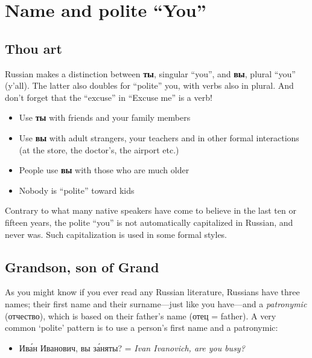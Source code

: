 \chapter{\texorpdfstring{Name and polite
``You''}{Name and polite You}}\label{name-and-polite-you}

\section{Thou art}\label{thou-art}

Russian makes a distinction between \textbf{ты}, singular ``you'', and
\textbf{вы}, plural ``you'' (y'all). The latter also doubles for
``polite'' you, with verbs also in plural. And don't forget that the
``excuse'' in ``Excuse me'' is a verb!

\begin{itemize}
\tightlist
\item
  Use \textbf{ты} with friends and your family members
\item
  Use \textbf{вы} with adult strangers, your teachers and in other
  formal interactions (at the store, the doctor's, the airport etc.)
\item
  People use \textbf{вы} with those who are much older
\item
  Nobody is ``polite'' toward kids
\end{itemize}

Contrary to what many native speakers have come to believe in the last
ten or fifteen years, the polite ``you'' is not automatically
capitalized in Russian, and never was. Such capitalization is used in
some formal styles.

\section{Grandson, son of Grand}\label{grandson-son-of-grand}

As you might know if you ever read any Russian literature, Russians have
three names; their first name and their surname---just like you
have---and a \emph{patronymic} (отчество), which is based on their
father's name (отец = father). A very common `polite' pattern is to use
a person's first name and a patronymic:

\begin{itemize}
\tightlist
\item
  Ив\'{а}н Иванович, вы з\'{а}няты? = \emph{Ivan Ivanovich, are you busy?}
\end{itemize}

